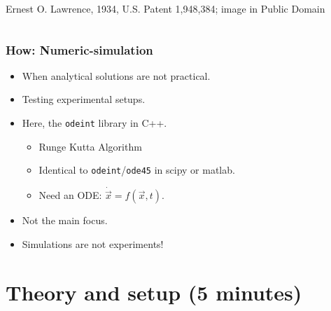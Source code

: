 \documentclass{beamer}
\begin{document}
\begin{frame}
\begin{columns}
\begin{column}{0.5\linewidth}
{{\color{gray} Ernest O. Lawrence, 1934, U.S. Patent 1,948,384; image in Public Domain}
}%
\end{column}
\end{columns}
\end{frame}


\begin{frame}
\frametitle{How: Numeric-simulation}
\begin{itemize}
\item<1-> When analytical solutions are not practical.
\item<2-> Testing experimental setups.
\item<3-> Here, the \lstinline{odeint} library in C++.
\begin{itemize}
\item<5-> Runge Kutta Algorithm
\item<5-> Identical to \lstinline{odeint}/\lstinline{ode45} in scipy or matlab.
\item<6-> Need an ODE: $\dot{\vec{x}}=f(\vec{x},t)$.
\end{itemize}
\item<4-> Not the main focus.
\item<7-> Simulations are not experiments!
\end{itemize}
\end{frame}

\section{Theory and setup (5 minutes)}
\end{document}
